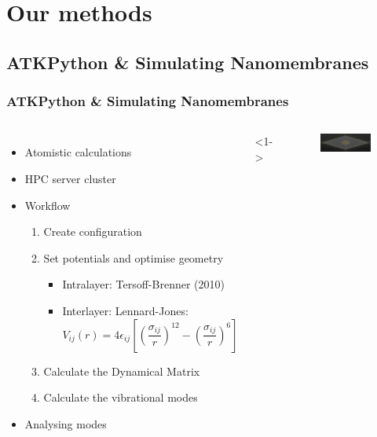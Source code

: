 \documentclass[hyperref={colorlinks=true,urlcolor=blue,linkcolor=.},aspectratio=1610,mathserif]{beamer}
\begin{document}
\section{Our methods}

\subsection{ATKPython \& Simulating Nanomembranes}

\begin{frame}
 \frametitle{ATKPython \& Simulating Nanomembranes}
 \begin{columns}[T]
  \begin{itemize}
   \item<1-> Atomistic calculations
   \item<2-> HPC server cluster
   \item<3-> Workflow
         \begin{enumerate}
          \item<3-> Create configuration
          \item<4-> Set potentials and optimise geometry
                \begin{itemize}
                 \item Intralayer: Tersoff-Brenner (2010)
                 \item Interlayer: Lennard-Jones:\begin{equation}
                        V_{ij}(r) = 4 \epsilon_{ij} \left[ \left( \frac{\sigma_{ij}}{r} \right) ^{12} - \left( \frac{\sigma_{ij}}{r} \right) ^6 \right] \nonumber
                       \end{equation}
                \end{itemize}
          \item<5-> Calculate the Dynamical Matrix
          \item<6-> Calculate the vibrational modes
         \end{enumerate}
   \item<7-> Analysing modes
  \end{itemize}
  <1->
  \begin{figure}
   \centering
   \includegraphics[width=\columnwidth]{Figures/NanoLayer5nm.png}

\end{figure}
\end{columns}
\end{frame}
\end{document}
